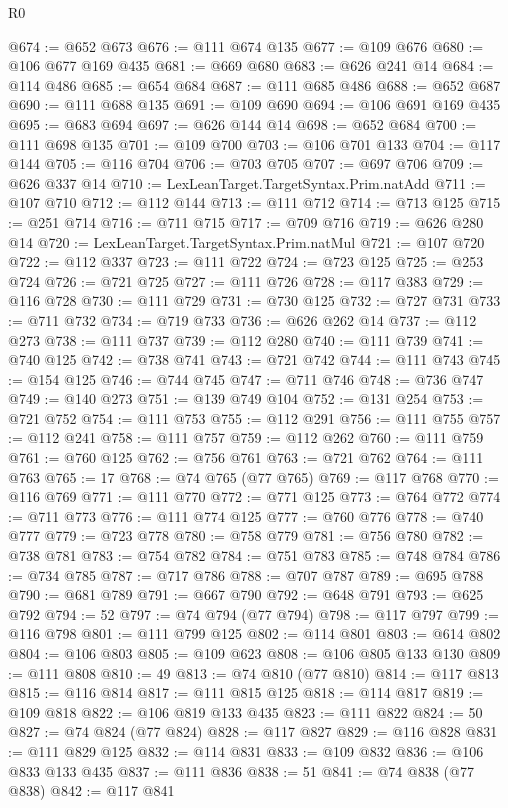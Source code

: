 \begin{lexlean}{R0}
\begin{coremodule}
@674 := @652 @673
@676 := @111 @674 @135
@677 := @109 @676
@680 := @106 @677 @169 @435
@681 := @669 @680
@683 := @626 @241 @14
@684 := @114 @486
@685 := @654 @684
@687 := @111 @685 @486
@688 := @652 @687
@690 := @111 @688 @135
@691 := @109 @690
@694 := @106 @691 @169 @435
@695 := @683 @694
@697 := @626 @144 @14
@698 := @652 @684
@700 := @111 @698 @135
@701 := @109 @700
@703 := @106 @701 @133
@704 := @117 @144
@705 := @116 @704
@706 := @703 @705
@707 := @697 @706
@709 := @626 @337 @14
@710 := LexLeanTarget.TargetSyntax.Prim.natAdd
@711 := @107 @710
@712 := @112 @144
@713 := @111 @712
@714 := @713 @125
@715 := @251 @714
@716 := @711 @715
@717 := @709 @716
@719 := @626 @280 @14
@720 := LexLeanTarget.TargetSyntax.Prim.natMul
@721 := @107 @720
@722 := @112 @337
@723 := @111 @722
@724 := @723 @125
@725 := @253 @724
@726 := @721 @725
@727 := @111 @726
@728 := @117 @383
@729 := @116 @728
@730 := @111 @729
@731 := @730 @125
@732 := @727 @731
@733 := @711 @732
@734 := @719 @733
@736 := @626 @262 @14
@737 := @112 @273
@738 := @111 @737
@739 := @112 @280
@740 := @111 @739
@741 := @740 @125
@742 := @738 @741
@743 := @721 @742
@744 := @111 @743
@745 := @154 @125
@746 := @744 @745
@747 := @711 @746
@748 := @736 @747
@749 := @140 @273
@751 := @139 @749 @104
@752 := @131 @254
@753 := @721 @752
@754 := @111 @753
@755 := @112 @291
@756 := @111 @755
@757 := @112 @241
@758 := @111 @757
@759 := @112 @262
@760 := @111 @759
@761 := @760 @125
@762 := @756 @761
@763 := @721 @762
@764 := @111 @763
@765 := 17
@768 := @74 @765 (@77 @765)
@769 := @117 @768
@770 := @116 @769
@771 := @111 @770
@772 := @771 @125
@773 := @764 @772
@774 := @711 @773
@776 := @111 @774 @125
@777 := @760 @776
@778 := @740 @777
@779 := @723 @778
@780 := @758 @779
@781 := @756 @780
@782 := @738 @781
@783 := @754 @782
@784 := @751 @783
@785 := @748 @784
@786 := @734 @785
@787 := @717 @786
@788 := @707 @787
@789 := @695 @788
@790 := @681 @789
@791 := @667 @790
@792 := @648 @791
@793 := @625 @792
@794 := 52
@797 := @74 @794 (@77 @794)
@798 := @117 @797
@799 := @116 @798
@801 := @111 @799 @125
@802 := @114 @801
@803 := @614 @802
@804 := @106 @803
@805 := @109 @623
@808 := @106 @805 @133 @130
@809 := @111 @808
@810 := 49
@813 := @74 @810 (@77 @810)
@814 := @117 @813
@815 := @116 @814
@817 := @111 @815 @125
@818 := @114 @817
@819 := @109 @818
@822 := @106 @819 @133 @435
@823 := @111 @822
@824 := 50
@827 := @74 @824 (@77 @824)
@828 := @117 @827
@829 := @116 @828
@831 := @111 @829 @125
@832 := @114 @831
@833 := @109 @832
@836 := @106 @833 @133 @435
@837 := @111 @836
@838 := 51
@841 := @74 @838 (@77 @838)
@842 := @117 @841

\end{coremodule}
\end{lexlean}
